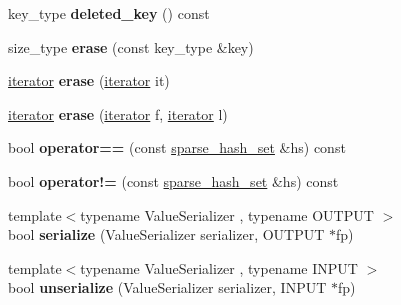 \begin{DoxyCompactItemize}
\item 
key\+\_\+type {\bfseries deleted\+\_\+key} () const \hypertarget{classspp___1_1sparse__hash__set_abe267730e944fcfe13ea5484c0f5cb7a}{}\label{classspp___1_1sparse__hash__set_abe267730e944fcfe13ea5484c0f5cb7a}

\item 
size\+\_\+type {\bfseries erase} (const key\+\_\+type \&key)\hypertarget{classspp___1_1sparse__hash__set_aa0294600a2e31c79337a2af6b7539868}{}\label{classspp___1_1sparse__hash__set_aa0294600a2e31c79337a2af6b7539868}

\item 
\hyperlink{classspp___1_1_two__d__iterator}{iterator} {\bfseries erase} (\hyperlink{classspp___1_1_two__d__iterator}{iterator} it)\hypertarget{classspp___1_1sparse__hash__set_aceb24d3c52477d0513430fe6f102e5b4}{}\label{classspp___1_1sparse__hash__set_aceb24d3c52477d0513430fe6f102e5b4}

\item 
\hyperlink{classspp___1_1_two__d__iterator}{iterator} {\bfseries erase} (\hyperlink{classspp___1_1_two__d__iterator}{iterator} f, \hyperlink{classspp___1_1_two__d__iterator}{iterator} l)\hypertarget{classspp___1_1sparse__hash__set_adf14e7bd9cb05afd8642b5f8c88d15de}{}\label{classspp___1_1sparse__hash__set_adf14e7bd9cb05afd8642b5f8c88d15de}

\item 
bool {\bfseries operator==} (const \hyperlink{classspp___1_1sparse__hash__set}{sparse\+\_\+hash\+\_\+set} \&hs) const \hypertarget{classspp___1_1sparse__hash__set_a49bfecc3defd8045106e1fc54593c547}{}\label{classspp___1_1sparse__hash__set_a49bfecc3defd8045106e1fc54593c547}

\item 
bool {\bfseries operator!=} (const \hyperlink{classspp___1_1sparse__hash__set}{sparse\+\_\+hash\+\_\+set} \&hs) const \hypertarget{classspp___1_1sparse__hash__set_a843664450e61f6442836e77aad6a532a}{}\label{classspp___1_1sparse__hash__set_a843664450e61f6442836e77aad6a532a}

\item 
{\footnotesize template$<$typename Value\+Serializer , typename O\+U\+T\+P\+UT $>$ }\\bool {\bfseries serialize} (Value\+Serializer serializer, O\+U\+T\+P\+UT $\ast$fp)\hypertarget{classspp___1_1sparse__hash__set_aa1ab906ed6373ade827642b920630921}{}\label{classspp___1_1sparse__hash__set_aa1ab906ed6373ade827642b920630921}

\item 
{\footnotesize template$<$typename Value\+Serializer , typename I\+N\+P\+UT $>$ }\\bool {\bfseries unserialize} (Value\+Serializer serializer, I\+N\+P\+UT $\ast$fp)\hypertarget{classspp___1_1sparse__hash__set_a75afc0a2ad2c8950136cc8767c0fced5}{}\label{classspp___1_1sparse__hash__set_a75afc0a2ad2c8950136cc8767c0fced5}


\end{DoxyCompactItemize}
